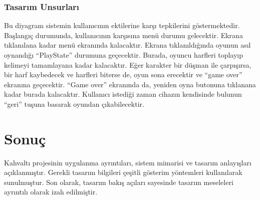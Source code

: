 \documentclass[12pt,a4paper]{article}
\begin{document}
   \subsubsection{Tasarım Unsurları}
   Bu diyagram sistemin kullanıcının ektilerine karşı tepkilerini göstermektedir. 
   Başlangıç durumunda, kullanıcının karşısına menü durumu gelecektir. Ekrana tıklanılana kadar menü ekranında kalacaktır.
   Ekrana tıklanıldığında oyunun asıl oynandığı “PlayState” durumuna geçecektir. Burada, oyuncu harfleri toplayıp kelimeyi tamamlayana kadar kalacaktır. Eğer karakter bir düşman ile çarpışırsa, bir harf kaybedecek ve harfleri biterse de, oyun sona erecektir ve “game over” ekranına geçecektir.
   “Game over” ekranında da, yeniden oyna butonuna tıklanana kadar burada kalacaktır.
   Kullanıcı istediği zaman cihazın kendisinde bulunun “geri” tuşuna basarak oyundan çıkabilecektir.
   
   \section{Sonuç}
   Kahvaltı projesinin uygulanma ayrıntıları, sistem mimarisi ve tasarım anlayışları açıklanmıştır. Gerekli tasarım bilgileri çeşitli gösterim yöntemleri kullanılarak sunulmuştur. Son olarak, tasarım bakış açıları sayesinde tasarım meseleleri ayrıntılı olarak izah edilmiştir.
\end{document}
